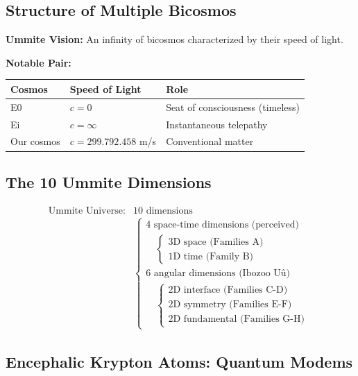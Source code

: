 \documentclass[11pt]{article}
\begin{document}
\hypertarget{structure-of-multiple-bicosmos}{%
\subsection{Structure of Multiple
Bicosmos}\label{structure-of-multiple-bicosmos}}

\textbf{Ummite Vision:} An infinity of bicosmos characterized by their
speed of light.

\textbf{Notable Pair:}

\begin{longtable}{@{}lll@{}}
\toprule
\textbf{Cosmos} & \textbf{Speed of Light} & \textbf{Role} \\
\midrule
E0 & $c = 0$ & Seat of consciousness (timeless) \\
Ei & $c = \infty$ & Instantaneous telepathy \\
Our cosmos & $c = 299.792.458$ m/s & Conventional matter \\
\bottomrule
\end{longtable}

\hypertarget{the-10-ummite-dimensions}{%
\subsection{The 10 Ummite Dimensions}\label{the-10-ummite-dimensions}}

\begin{align*}
\text{Ummite Universe} : & \text{10 dimensions} \\
& \begin{cases}
\text{4 space-time dimensions (perceived)} \\
\quad \begin{cases}
\text{3D space (Families A)} \\
\text{1D time (Family B)}
\end{cases} \\
\text{6 angular dimensions (Ibozoo Uû)} \\
\quad \begin{cases}
\text{2D interface (Families C-D)} \\
\text{2D symmetry (Families E-F)} \\
\text{2D fundamental (Families G-H)}
\end{cases}
\end{cases}
\end{align*}

\hypertarget{encephalic-krypton-atoms-quantum-modems}{%
\subsection{Encephalic Krypton Atoms: Quantum
Modems}\label{encephalic-krypton-atoms-quantum-modems}}
\end{document}
